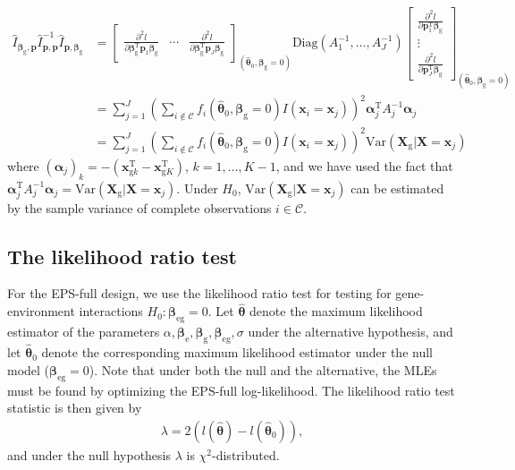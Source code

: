 \documentclass[10pt,a4paper]{article}
\def\bbetag{\bm{\beta}_{\text{g}}}
\def\bbetae{\bm{\beta}_{\text{e}}}
\def\bbetaeg{\bm{\beta}_{\text{eg}}}
\def\bx{\mathbf{x}}
\def\bX{\mathbf{X}}
\def\bxgk{\mathbf{x}_{\text{g}k}}
\def\bxgK{\mathbf{x}_{\text{g}K}}
\def\bXg{\mathbf{X}_{\text{g}}}
\begin{document}
\begin{align*}
\hat{I}_{\bbetag, \mathbf{p}} \hat{I}_{\mathbf{p}, \mathbf{p}}^{-1} \hat{I}_{\mathbf{p},\bbetag} & = 
\begin{bmatrix}
\frac{\partial^2 l}{\partial \bbetag^{\text{T}} \mathbf{p}_1 \bbetag} &
\cdots & 
\frac{\partial^2 l}{\partial \bbetag^{\text{T}} \mathbf{p}_J \bbetag}
\end{bmatrix}_{(\hat{\boldsymbol\theta}_0, \bbetag= 0)}
\text{Diag}(A_1^{-1}, \ldots, A_J^{-1}) 
\begin{bmatrix}
\frac{\partial^2 l}{\partial \mathbf{p}_1^{\text{T}} \bbetag} \\
\vdots \\
\frac{\partial^2 l}{\partial \mathbf{p}_J^{\text{T}} \bbetag}
\end{bmatrix}_{(\hat{\boldsymbol\theta}_0, \bbetag= 0)}  \\
& = \sum_{j = 1}^{J} \left(\sum_{i \not \in \mathcal{C}} f_i(\hat{\boldsymbol\theta}_0, \bbetag= 0)I(\bx_i = \bx_j)\right)^2 \boldsymbol\alpha_j^{\text{T}} A_j^{-1} \boldsymbol\alpha_j \\
& = \sum_{j = 1}^{J} \left(\sum_{i \not \in \mathcal{C}} f_i(\hat{\boldsymbol\theta}_0, \bbetag= 0)I(\bx_i = \bx_j)\right)^2 \text{Var}(\bXg|\bX = \bx_j)
\end{align*}
where $(\boldsymbol\alpha_j)_k = - (\bxgk^{\text{T}} - \bxgK^{\text{T}})$, $k=1,\ldots,K-1$, and we have used the fact that $\boldsymbol\alpha_j^{\text{T}} A_j^{-1} \boldsymbol\alpha_j = \text{Var}(\bXg|\bX = \bx_j)$. Under $H_0$, $\text{Var}(\bXg|\bX = \bx_j)$ can be estimated by the sample variance of complete observations $i \in \mathcal{C}$.

\subsection{The likelihood ratio test}
For the EPS-full design, we use the likelihood ratio test for testing for gene-environment interactions $H_0: \bbetaeg = 0$. Let $\hat{\boldsymbol\theta}$ denote the maximum likelihood estimator of the parameters $\alpha, \bbetae, \bbetag, \bbetaeg, \sigma$ under the alternative hypothesis, and let $\hat{\boldsymbol\theta}_0$ denote the corresponding maximum likelihood estimator under the null model ($\bbetaeg = 0$). Note that under both the null and the alternative, the MLEs must be found by optimizing the EPS-full log-likelihood. The likelihood ratio test statistic is then given by
\begin{align*}
\lambda = 2(l(\hat{\boldsymbol\theta}) - l(\hat{\boldsymbol\theta}_0)),
\end{align*}
and under the null hypothesis $\lambda$ is $\chi^2$-distributed.
\end{document}
